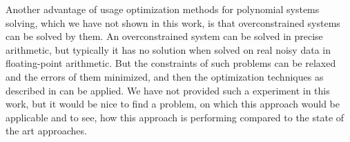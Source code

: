 Another advantage of usage optimization methods for polynomial systems solving, which we have not shown in this work, is that overconstrained systems can be solved by them.
An overconstrained system can be solved in precise arithmetic, but typically it has no solution when solved on real noisy data in floating-point arithmetic.
But the constraints of such problems can be relaxed and the errors of them minimized, and then the optimization techniques as described in  can be applied.
We have not provided such a experiment in this work, but it would be nice to find a problem, on which this approach would be applicable and to see, how this approach is performing compared to the state of the art approaches.
